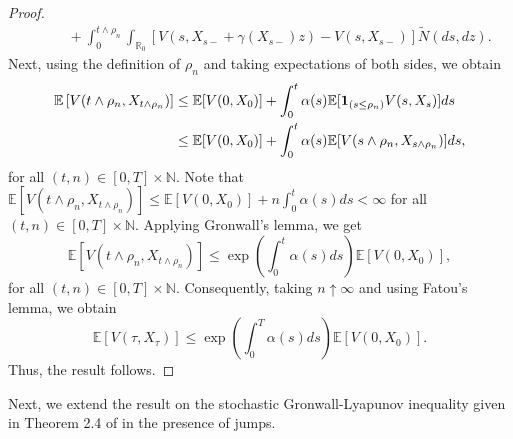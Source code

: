 \documentclass[11pt]{article}
\theoremstyle{theorem}
\theoremstyle{definition}
\newcommand{\bR}{\mathbb{R}}
\newcommand{\1}{{\bf 1}}
\begin{document}
\begin{proof}
\begin{align*}
   & \qquad + \int_0^{t\land \rho_n} \int_{\bR_0} \left[ V(s, X_{s-} + \gamma (X_{s- })z ) - V(s, X_{s-})  \right] \widetilde{N}(ds,dz).  
\end{align*}
 Next, using the definition of $\rho_n$ and taking expectations of both sides, we obtain
 \begin{align*}
    \mathbb{E} \left[ V(t\land \rho_n, X_{t\land \rho_n})\right] & \leq  \mathbb{E} [V(0, X_0)] + \int_0^{t} \alpha(s)\mathbb{E}[{\bf 1}_{(s \leq \rho_n)} V(s, X_s)]ds \notag \\
    & \leq \mathbb{E}[V(0, X_0)] + \int_0^{t} \alpha(s)\mathbb{E}[V(s\land \rho_n, X_{s\land \rho_n})] ds,
 \end{align*}
for all $(t,n) \in [0,T]\times \mathbb{N}$. Note that  $\mathbb{E} \left[ V(t\land \rho_n, X_{t\land \rho_n})\right] \leq  \mathbb{E}[V(0, X_0)] + n \int_0^{t} \alpha(s) ds <\infty$ for all $(t,n) \in [0,T]\times \mathbb{N}$. Applying Gronwall's lemma, we get 
$$\mathbb{E} \left[ V(t\land \rho_n, X_{t\land \rho_n})\right] \leq \exp \left( \int_0^t \alpha(s) ds \right) \mathbb{E}[V(0, X_0)],$$ 
for all $(t,n) \in [0,T]\times \mathbb{N}$.
Consequently, taking $n\uparrow \infty$ and using Fatou’s lemma, we obtain
$$\mathbb{E} \left[ V(\tau, X_{\tau})\right] \leq \exp \left( \int_0^T \alpha(s) ds \right) \mathbb{E}[V(0, X_0)].$$
Thus, the result follows.
\end{proof}
Next, we extend the result on the stochastic Gronwall-Lyapunov inequality given in Theorem 2.4 of \cite{HHM21} in the presence of jumps.
\end{document}
